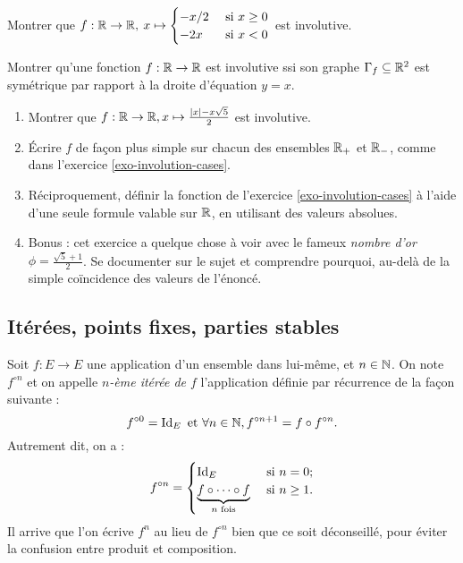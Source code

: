 \begin{exercice}\label{exo-involution-cases}
Montrer que $f:\mathbb{R}\to \mathbb{R},\: x\mapsto \begin{cases} -x/2 & \text{ si }x\geq 0\\-2x & \text{ si }x<0\end{cases}$ est involutive.
\end{exercice}

\begin{exercice}\label{exo-involution-graphe-sym}
Montrer qu'une fonction $f:\mathbb{R}\to \mathbb{R}$ est involutive ssi son graphe $\Gamma_f \subseteq \mathbb{R}^2$ est symétrique par rapport à la droite d'équation $y=x$. 
\end{exercice}

\begin{exercice}\label{exo-involution-abs}
\begin{enumerate}
\item Montrer que $f : \mathbb{R}\to \mathbb{R}, x\mapsto \frac{|x|-x\sqrt 5}{2}$ est involutive.
\item Écrire $f$ de façon plus simple sur chacun des ensembles $\mathbb{R}_+$ et $\mathbb{R}_-$, comme dans l'exercice \ref{exo-involution-cases}.
\item Réciproquement, définir la fonction de l'exercice \ref{exo-involution-cases} à l'aide d'une seule formule valable sur $\mathbb{R}$, en utilisant des valeurs absolues.
\item Bonus : cet exercice a quelque chose à voir avec le fameux \emph{nombre d'or} $\phi = \frac{\sqrt 5 +1}{2}$. Se documenter sur le sujet et comprendre pourquoi, au-delà de la simple coïncidence des valeurs de l'énoncé.
\end{enumerate}
\end{exercice}



\subsection{Itérées, points fixes, parties stables}

\begin{definition}
Soit $f : E\to E$ une application d'un ensemble dans lui-même, et $n\in \mathbb{N}$. On  note $f^{\circ n}$ et on appelle \emph{$n$-ème itérée de $f$}  l'application définie par récurrence de la façon suivante :
\[ f^{\circ 0} = \operatorname{Id}_E \text{ et } \forall n\in \mathbb{N}, f^{\circ n+1} = f\circ f^{\circ n}.\]
Autrement dit, on a :
\[ 
f^{\circ n} = \begin{cases}
\operatorname{Id}_E & \text{ si } n=0;\\
\underbrace{f\circ \dots \circ f}_{n \text{ fois}} & \text{ si } n\geq 1.
\end{cases}
\]
Il arrive que l'on écrive $f^n$ au lieu de $f^{\circ n}$ bien que ce soit déconseillé, pour éviter la confusion entre produit et composition.
\end{definition}

